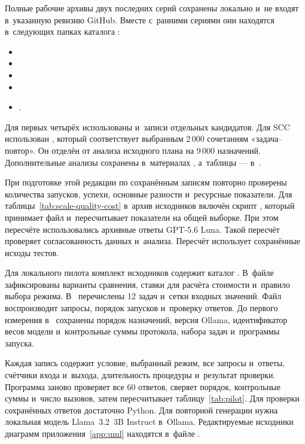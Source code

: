 Полные рабочие архивы двух последних серий сохранены локально и~не входят в~указанную ревизию GitHub. Вместе с~ранними сериями они находятся в~следующих папках каталога :
\begin{itemize}
\item {}
\item {}
\item {}
\item {}
\item {}.
\end{itemize}
Для первых четырёх использованы  и~записи отдельных кандидатов. Для SCC использован , который соответствует выбранным 2\,000 сочетаниям «задача--повтор». Он отделён от анализа исходного плана на 9\,000 назначений. Дополнительные анализы сохранены в~материалах , а~таблицы --- в~.

При подготовке этой редакции по сохранённым записям повторно проверены количества запусков, успехи, основные разности и~ресурсные показатели. Для таблицы~\ref{tab:scale-quality-cost} в~архив исходников включён скрипт , который принимает файл  и~пересчитывает показатели на общей выборке. При этом пересчёте использовались архивные ответы GPT-5.6 Luna. Такой пересчёт проверяет согласованность данных и~анализа. Пересчёт использует сохранённые исходы тестов.


Для локального пилота комплект исходников содержит каталог . В~файле  зафиксированы варианты сравнения, ставки для расчёта стоимости и~правило выбора режима. В~ перечислены 12 задач и~сетки входных значений. Файл  воспроизводит запросы, порядок запусков и~проверку ответов. До первого измерения в~ сохранены порядок назначений, версия Ollama, идентификатор весов модели и~контрольные суммы протокола, набора задач и~программы запуска.

Каждая запись  содержит условие, выбранный режим, все запросы и~ответы, счётчики входа и~выхода, длительность процедуры и~результат проверки. Программа  заново проверяет все 60 ответов, сверяет порядок, контрольные суммы и~число вызовов, затем пересчитывает таблицу~\ref{tab:pilot}. Для проверки сохранённых ответов достаточно Python. Для повторной генерации нужна локальная модель Llama~3.2~3B Instruct в~Ollama. Редактируемые исходники диаграмм приложения~\ref{app:uml} находятся в~файле .


